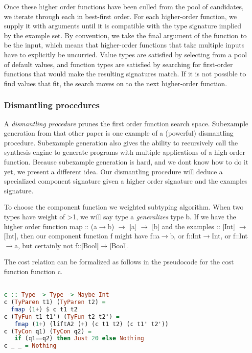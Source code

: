 Once these higher order functions have been culled from the pool of candidates, we iterate through each in best-first order. For each higher-order function, we supply it with arguments until it is compatible with the type signature implied by the example set. By convention, we take the final argument of the function to be the input, which means that higher-order functions that take multiple inputs have to explicitly be uncurried. Value types are satisfied by selecting from a pool of default values, and function types are satisfied by searching for first-order functions that would make the resulting signatures match. If it is not possible to find values that fit, the search moves on to the next higher-order function.

\subsubsection{Dismantling procedures}

A \textit{dismantling procedure} prunes the first order function search space.
Subexample generation from that other paper\cite{isil} is one example of a (powerful) dismantling procedure. Subexample generation also gives the ability to recursively call the synthesis engine to generate programs with multiple applications of a high order function.
Because subexample generation is hard, and we dont know how to do it yet, we present a different idea.
Our dismantling procedure will deduce a specialized component signature given a higher order signature and the examples signature.

To choose the component function we weighted subtyping algorithm.
When two types have weight of >1, we will say type a \textit{generalizes} type b.
If we have the higher order function map :: (a$\to$b) $\to$ [a] $\to$ [b] and the examples :: [Int] $\to$ [Int], then our component function f might have f::a$\to$b, or f::Int$\to$Int, or f::Int$\to$a, but certainly not f::[Bool]$\to$[Bool].

The cost relation can be formalized as follows in the pseudocode for the cost function function c.
\begin{lstlisting}[language=haskell]

c :: Type -> Type -> Maybe Int
c (TyParen t1) (TyParen t2) =
  fmap (1+) $ c t1 t2
c (TyFun t1 t1') (TyFun t2 t2') =
   fmap (1+) (liftA2 (+) (c t1 t2) (c t1' t2'))
c (TyCon q1) (TyCon q2) =
   if (q1==q2) then Just 20 else Nothing
c _ _ = Nothing

\end{lstlisting}



